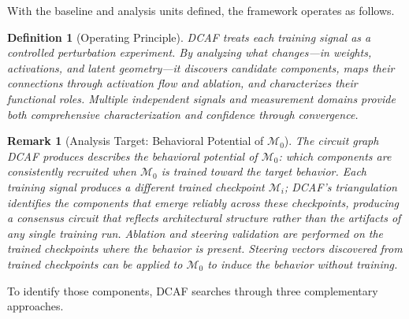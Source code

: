 \documentclass[11pt]{article}
\newtheorem{definition}{Definition}[section]
\newtheorem{remark}{Remark}[section]
\begin{document}
With the baseline and analysis units defined, the framework operates as follows.

\begin{definition}[Operating Principle]
\label{def:operating-principle}
DCAF treats each training signal as a controlled perturbation experiment. By analyzing what changes—in weights, activations, and latent geometry—it \textit{discovers} candidate components, \textit{maps} their connections through activation flow and ablation, and \textit{characterizes} their functional roles. Multiple independent signals and measurement domains provide both comprehensive characterization and confidence through convergence.
\end{definition}

\begin{remark}[Analysis Target: Behavioral Potential of $\mathcal{M}_0$]
\label{rem:analysis-target}
The circuit graph DCAF produces describes the behavioral potential of $\mathcal{M}_0$: which components are consistently recruited when $\mathcal{M}_0$ is trained toward the target behavior. Each training signal produces a different trained checkpoint $\mathcal{M}_i$; DCAF's triangulation identifies the components that emerge reliably across these checkpoints, producing a consensus circuit that reflects architectural structure rather than the artifacts of any single training run. Ablation and steering validation are performed on the trained checkpoints where the behavior is present. Steering vectors discovered from trained checkpoints can be applied to $\mathcal{M}_0$ to induce the behavior without training.
\end{remark}

To identify those components, DCAF searches through three complementary approaches.
\end{document}
